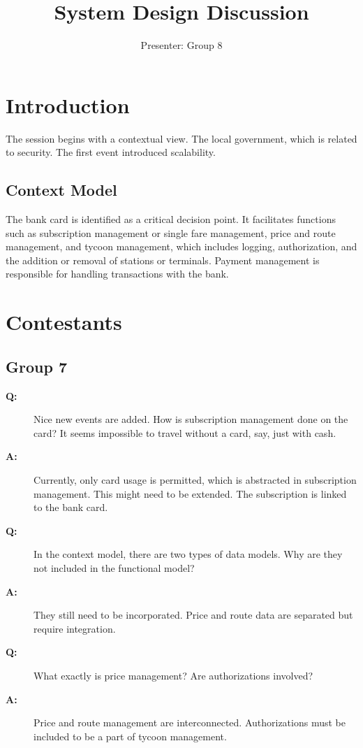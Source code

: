 \documentclass{article}
\title{System Design Discussion}
\author{Presenter: Group 8}
\begin{document}
\maketitle

\section{Introduction}
The session begins with a contextual view. The local government, which is related to security. The first event introduced scalability.

\subsection{Context Model}
The bank card is identified as a critical decision point. It facilitates functions such as subscription management or single fare management, price and route management, and tycoon management, which includes logging, authorization, and the addition or removal of stations or terminals. Payment management is responsible for handling transactions with the bank.

\section{Contestants}

\subsection{Group 7}
\begin{description}
  \item[\textbf{Q:}] Nice new events are added. How is subscription management done on the card? It seems impossible to travel without a card, say, just with cash.
  \item[\textbf{A:}] Currently, only card usage is permitted, which is abstracted in subscription management. This might need to be extended. The subscription is linked to the bank card.
  
  \item[\textbf{Q:}] In the context model, there are two types of data models. Why are they not included in the functional model?
  \item[\textbf{A:}] They still need to be incorporated. Price and route data are separated but require integration.
  
  \item[\textbf{Q:}] What exactly is price management? Are authorizations involved?
  \item[\textbf{A:}] Price and route management are interconnected. Authorizations must be included to be a part of tycoon management.
\end{description}
\end{document}
